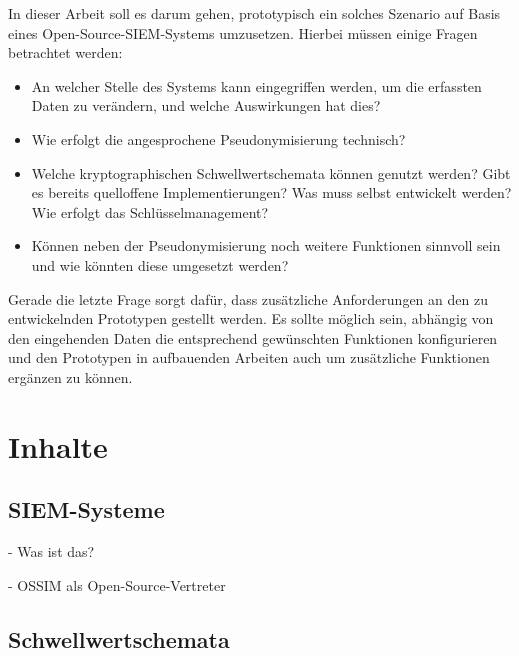 \documentclass[
    fontsize=12pt,
    headings=small,
    parskip=half,           %
    bibliography=totoc,
    numbers=noenddot,       %
    open=any,               %
    ]{scrreprt}
\begin{document}
In dieser Arbeit soll es darum gehen, prototypisch ein solches Szenario auf Basis eines Open-Source-SIEM-Systems umzusetzen. Hierbei müssen einige Fragen betrachtet werden:

\begin{itemize}
\item An welcher Stelle des Systems kann eingegriffen werden, um die erfassten Daten zu verändern, und welche Auswirkungen hat dies?
\item Wie erfolgt die angesprochene Pseudonymisierung technisch?
\item Welche kryptographischen Schwellwertschemata können genutzt werden? Gibt es bereits quelloffene Implementierungen? Was muss selbst entwickelt werden? Wie erfolgt das Schlüsselmanagement?
\item Können neben der Pseudonymisierung noch weitere Funktionen sinnvoll sein und wie könnten diese umgesetzt werden?
\end{itemize}

Gerade die letzte Frage sorgt dafür, dass zusätzliche Anforderungen an den zu entwickelnden Prototypen gestellt werden. Es sollte möglich sein, abhängig von den eingehenden Daten die entsprechend gewünschten Funktionen konfigurieren und den Prototypen in aufbauenden Arbeiten auch um zusätzliche Funktionen ergänzen zu können.


\chapter{Inhalte}

\section{SIEM-Systeme}

\label{sec_siem}

- Was ist das?

- OSSIM als Open-Source-Vertreter



\section{Schwellwertschemata}
\end{document}
